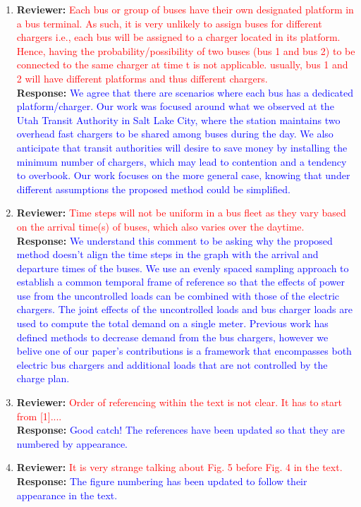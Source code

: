 \documentclass{article}
\newcommand\formatfeedback[2]
{%
	\textbf{Reviewer:} \textcolor{red}{#1} 
	\leavevmode\\[0.1in] \textbf{Response:} \textcolor{blue}{#2}
}
\begin{document}
\begin{enumerate}
	\item \formatfeedback{Each bus or group of buses have their own designated platform in a bus terminal. As such, it is very unlikely to assign buses for different chargers i.e., each bus will be assigned to a charger located in its platform. Hence, having the probability/possibility of two buses (bus 1 and bus 2) to be connected to the same charger at time t is not applicable. usually, bus 1 and 2 will have different platforms and thus different chargers.}{We agree that there are scenarios where each bus has a dedicated platform/charger. Our work was focused around what we observed at the Utah Transit Authority in Salt Lake City, where the station maintains two overhead fast chargers to be shared among buses during the day. We also anticipate that transit authorities will desire to save money by installing the minimum number of chargers, which may lead to contention and a tendency to overbook. Our work focuses on the more general case, knowing that under different assumptions the proposed method could be simplified.}
	\item \formatfeedback{Time steps will not be uniform in a bus fleet as they vary based on the arrival time(s) of buses, which also varies over the daytime.}{ We understand this comment to be asking why the proposed method doesn't align the time steps in the graph with the arrival and departure times of the buses. We use an evenly spaced sampling approach to establish a common temporal frame of reference so that the effects of power use from the uncontrolled loads can be combined with those of the electric chargers. The joint effects of the uncontrolled loads and bus charger loads are used to compute the total demand on a single meter. Previous work has defined methods to decrease demand from the bus chargers, however we belive one of our paper's contributions is a framework that encompasses both electric bus chargers and additional loads that are not controlled by the charge plan.} 
	\item \formatfeedback{Order of referencing within the text is not clear. It has to start from [1]....}{Good catch! The references have been updated so that they are numbered by appearance.}
	\item \formatfeedback{It is very strange talking about Fig. 5 before Fig. 4 in the text.}{The figure numbering has been updated to follow their appearance in the text.}

\end{enumerate}
\end{document}
